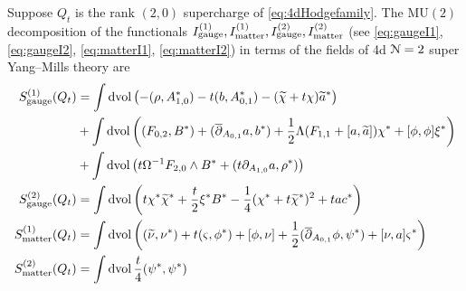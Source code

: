 \documentclass[10pt, oneside]{article}
\newcommand{\MU}{\mathrm{MU}}
\begin{document}
\begin{prop}
\label{4d_donaldson_susy_prop}
Suppose $Q_t$ is the rank $(2,0)$ supercharge of \ref{eq:4dHodgefamily}.
The $\MU(2)$ decomposition of the functionals $I_{\rm gauge}^{(1)}, I^{(1)}_{\rm matter}, I^{(2)}_{\rm gauge}, I^{(2)}_{\rm matter}$ (see \eqref{eq:gaugeI1},  \eqref{eq:gaugeI2}, \eqref{eq:matterI1}, \eqref{eq:matterI2}) in terms of the fields of 4d $\mathcal N=2$ super Yang--Mills theory are
\begin{align*}
S_{\rm gauge}^{(1)}(Q_t) &= \int \operatorname{dvol}\left(-(\rho, A_{1, 0}^*) - t(b, A_{0, 1}^*) - (\widetilde{\chi} + t\chi)\widetilde{a}^*\right) \\
& + \int\operatorname{dvol}\left((F_{0, 2}, B^*) + (\overline{\partial}_{A_{0, 1}}a, b^*) + \frac{1}{2}\Lambda(F_{1, 1}  + [a, \widetilde{a}])\chi^* + [\phi, \phi]\xi^* \right) \\
&+ \int\operatorname{dvol}\left( t\Omega^{-1} F_{2, 0}\wedge B^* + (t\partial_{A_{1, 0}} a, \rho^*)\right) \\
S^{(2)}_{\rm gauge} (Q_t) &= \int \operatorname{dvol} \left(t\chi^*\widetilde{\chi}^* + \frac{t}{2} \xi^* B^* -\frac{1}{4}(\chi^* + t\widetilde{\chi}^*)^2 + t a c^*\right) \\
S_{\rm matter}^{(1)}(Q_t) &= \int \operatorname{dvol} \left((\widetilde{\nu}, \nu^*) + t (\varsigma, \phi^*) + [\phi, \nu] + \frac{1}{2} (\overline{\partial}_{A_{0,1}} \phi, \psi^*) + [\nu, a]\varsigma^* \right) \\
S_{\rm matter}^{(2)}(Q_t) &= \int \operatorname{dvol} \frac t4  (\psi^*, \psi^*)
\end{align*}
\end{prop}

\end{document}
